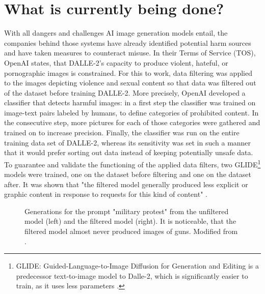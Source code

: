 \documentclass[10pt,twocolumn,twoside]{osajnl}
\begin{document}
\section{What is currently being done?}
\label{section:6}
With all dangers and challenges AI image generation models entail, the companies behind those systems have already identified potential harm sources and have taken measures to counteract misuse.
In their Terms of Service (TOS), OpenAI states, that DALLE-2's capacity to produce violent, hateful, or pornographic images is constrained. 
For this to work, data filtering was applied to the images depicting violence and sexual content so that data was filtered out of the dataset before training DALLE-2.
More precisely, OpenAI developed a classifier that detects harmful images: in a first step the classifier was trained on image-text pairs labeled by humans, to define categories 
of prohibited content. In the consecutive step, more pictures for each of those categories were gathered and trained on to increase precision. Finally, the classifier was run on the entire 
training data set of DALLE-2, whereas its sensitivity was set in such a manner that it would prefer sorting out data instead of keeping potentially unsafe data. 
To guarantee and validate the functioning of the applied data filters, two GLIDE\footnote[5]{GLIDE: Guided-Language-to-Image Diffusion for Generation and Editing is a predecessor text-to-image model to Dalle-2, which is significantly easier to train, as it uses less parameters \cite{glide}.} models were trained, one on the dataset before filtering and one on the dataset after.
It was shown that "the filtered model generally produced less explicit or graphic content in response to requests for this kind of content" \cite{openaifilters}. 
\begin{figure}[htbp]
	\centering
	\caption{Generations for the prompt "military protest" from the unfiltered model (left) and the filtered model (right). 
	It is noticeable, that the filtered model almost never produced images of guns. Modified from \cite{openaifilters}.}
	\label{filters}
\end{figure}
\end{document}

